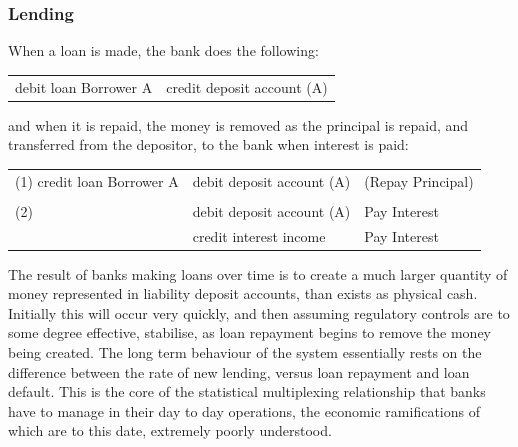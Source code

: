 \documentclass[10pt,oneside,openright, a4paper]{memoir}
\begin{document}
\subsubsection{Lending}
When a loan is made, the bank does the following:
\begin{table}[H]
\centering
\begin{tabular}{ll}
debit loan Borrower A & credit deposit account (A)\\
\end{tabular}
\end{table}
and when it is repaid, the money is removed as the principal
is repaid, and transferred from the depositor, to the bank
when interest is paid:
\par
\begin{table}[H]
\centering
\begin{tabular}{lll}
(1) credit loan Borrower A & debit deposit account (A) & (Repay Principal)\\
                           &                           &                \\
(2)                        & debit deposit account (A) & Pay Interest \\
                           & credit interest income    & Pay Interest \\
\end{tabular}
\end{table}
The result of banks making loans over time is to create a much larger
quantity of money represented in liability deposit accounts,
than exists as physical cash. Initially this will occur very quickly,
and then assuming regulatory controls are to some degree effective,
stabilise, as loan repayment begins to remove the money being created. The
long term behaviour of the system essentially rests on the difference
between the rate of new lending, versus loan repayment and loan default.
This is the core of
the statistical multiplexing relationship
that banks have to manage in their day to day operations, the
economic ramifications of which are to this date, extremely
poorly understood.
\end{document}
